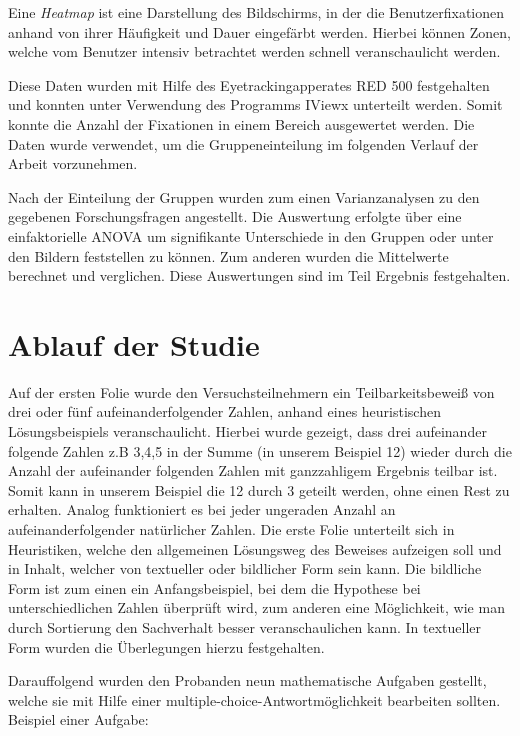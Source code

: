 Eine \textit{Heatmap} ist eine Darstellung des Bildschirms, in der die Benutzerfixationen anhand von ihrer Häufigkeit und Dauer eingefärbt werden. Hierbei können Zonen, welche vom Benutzer intensiv betrachtet werden schnell veranschaulicht werden.

Diese Daten wurden mit Hilfe des Eyetrackingapperates RED 500 festgehalten und konnten unter Verwendung des Programms IViewx unterteilt werden. Somit konnte die Anzahl der Fixationen in einem Bereich ausgewertet werden. Die Daten wurde verwendet, um die Gruppeneinteilung im folgenden Verlauf der Arbeit vorzunehmen.

Nach der Einteilung der Gruppen wurden zum einen Varianzanalysen zu den gegebenen Forschungsfragen angestellt. Die Auswertung erfolgte über eine einfaktorielle ANOVA um signifikante Unterschiede in den Gruppen oder unter den Bildern feststellen zu können. Zum anderen wurden die Mittelwerte berechnet und verglichen. Diese Auswertungen sind im Teil Ergebnis festgehalten.

\section{Ablauf der Studie}

Auf der ersten Folie wurde den Versuchsteilnehmern ein Teilbarkeitsbeweiß von drei oder fünf aufeinanderfolgender Zahlen, anhand eines heuristischen Lösungsbeispiels veranschaulicht. Hierbei wurde gezeigt, dass drei aufeinander folgende Zahlen z.B 3,4,5 in der Summe (in unserem Beispiel 12) wieder durch die Anzahl der aufeinander folgenden Zahlen mit ganzzahligem Ergebnis teilbar ist. Somit kann in unserem Beispiel die 12 durch 3 geteilt werden, ohne einen Rest zu erhalten.
Analog funktioniert es bei jeder ungeraden Anzahl an aufeinanderfolgender natürlicher Zahlen. Die erste Folie unterteilt sich in Heuristiken, welche den allgemeinen Lösungsweg des Beweises aufzeigen soll und in Inhalt, welcher von textueller oder bildlicher Form sein kann. Die bildliche Form ist zum einen ein Anfangsbeispiel, bei dem die Hypothese bei unterschiedlichen Zahlen überprüft wird, zum anderen eine Möglichkeit, wie man durch Sortierung den Sachverhalt besser veranschaulichen kann. In textueller Form wurden die Überlegungen hierzu festgehalten.

Darauffolgend wurden den Probanden neun mathematische Aufgaben gestellt, welche sie mit Hilfe einer multiple-choice-Antwortmöglichkeit bearbeiten sollten. Beispiel einer Aufgabe:

